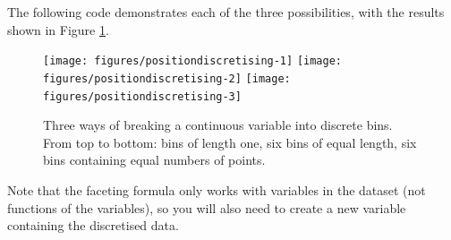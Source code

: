 The following code demonstrates each of the three possibilities, with
the results shown in Figure \ref{fig:discretising}.

\begin{Shaded}
\begin{Highlighting}[]
\StringTok{ } \NormalTok{)}
\StringTok{ } \NormalTok{)}
\StringTok{ } \NormalTok{)}

\StringTok{ } \StringTok{ }\NormalTok{(} \NormalTok{, } \NormalTok{)}
\StringTok{ }\NormalTok{(~}\StringTok{ } \NormalTok{)}
\StringTok{ }\NormalTok{(~}\StringTok{ } \NormalTok{)}
\StringTok{ }\NormalTok{(~}\StringTok{ } \NormalTok{)}
\end{Highlighting}
\end{Shaded}

\begin{figure}

{\centering \texttt{[image: figures/positiondiscretising-1]} \texttt{[image: figures/positiondiscretising-2]} \texttt{[image: figures/positiondiscretising-3]} 

}

\caption{ Three ways of breaking a continuous variable into discrete bins. From top to bottom: bins of length one, six bins of equal length, six bins containing equal numbers of points.\label{fig:discretising}}
\end{figure}

Note that the faceting formula only works with variables in the dataset
(not functions of the variables), so you will also need to create a new
variable containing the discretised data.


